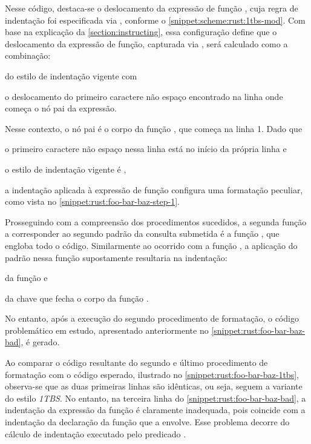 \documentclass
  [11pt,a4paper,english,brazil,openright,sumario=tradicional,twoside]
  {abntex2}
\begin{document}
  Nesse código, destaca-se o deslocamento da expressão de função
  , cuja regra de indentação foi especificada
  via , conforme o
  \cref{snippet:scheme:rust:1tbs-mod}. Com base na explicação da
  \cref{section:instructing}, essa configuração define que o deslocamento da
  expressão de função, capturada via , será calculado
  como a combinação:
  \begin{inparaenum}
    \item do estilo de indentação vigente com
    \item o deslocamento do primeiro caractere não espaço encontrado na linha
          onde começa o nó pai da expressão.
  \end{inparaenum}
  Nesse contexto, o nó pai é o corpo da função , que
  começa na linha 1. Dado que
  \begin{inparaenum}
    \item o primeiro caractere não espaço nessa linha está no início da própria
          linha e
    \item o estilo de indentação vigente é ,
  \end{inparaenum}
  a indentação aplicada à expressão de função 
  configura uma formatação peculiar, como vista no
  \cref{snippet:rust:foo-bar-baz-step-1}.

  Prosseguindo com a compreensão dos procedimentos sucedidos, a segunda função
  a corresponder ao segundo padrão da consulta submetida é a função
  , que engloba todo o código. Similarmente ao ocorrido
  com a função , a aplicação do padrão nessa função
  supostamente resultaria na indentação:
  \begin{inparaenum}
    \item da função  e
    \item da chave que fecha o corpo da função .
  \end{inparaenum}
  No entanto, após a execução do segundo procedimento de formatação, o código
  problemático em estudo, apresentado anteriormente no
  \cref{snippet:rust:foo-bar-baz-bad}, é gerado.

  Ao comparar o código resultante do segundo e último procedimento de
  formatação com o código esperado, ilustrado no
  \cref{snippet:rust:foo-bar-baz-1tbs}, observa-se que as duas primeiras linhas
  são idênticas, ou seja, seguem a variante do estilo \textit{1TBS}. No
  entanto, na terceira linha do \cref{snippet:rust:foo-bar-baz-bad}, a
  indentação da expressão da função  é
  claramente inadequada, pois coincide com a indentação da declaração da função
  que a envolve. Esse problema decorre do cálculo de indentação executado pelo
  predicado .
\end{document}
